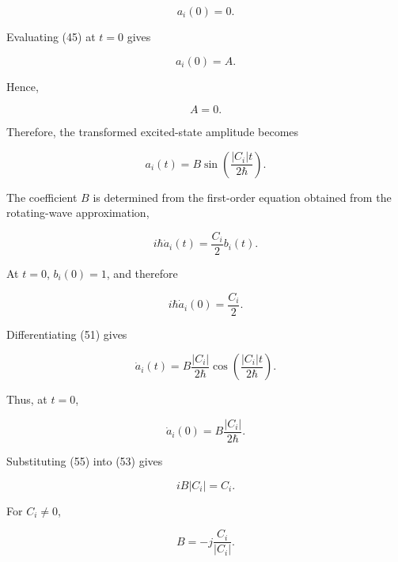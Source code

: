 \documentclass[12pt,a4paper]{article}
\begin{document}
\begin{equation}
a_i(0)=0.
\tag{48}
\end{equation}

Evaluating (45) at $t=0$ gives

\begin{equation}
a_i(0)=A.
\tag{49}
\end{equation}

Hence,

\begin{equation}
A=0.
\tag{50}
\end{equation}

Therefore, the transformed excited-state amplitude becomes

\begin{equation}
a_i(t)
=
B\sin\left(\frac{|C_i|t}{2\hbar}\right).
\tag{51}
\end{equation}

The coefficient $B$ is determined from the first-order equation obtained from the rotating-wave approximation,

\begin{equation}
i\hbar\dot a_i(t)=\frac{C_i}{2}b_i(t).
\tag{52}
\end{equation}

At $t=0$, $b_i(0)=1$, and therefore

\begin{equation}
i\hbar\dot a_i(0)=\frac{C_i}{2}.
\tag{53}
\end{equation}

Differentiating (51) gives

\begin{equation}
\dot a_i(t)
=
B\frac{|C_i|}{2\hbar}
\cos\left(\frac{|C_i|t}{2\hbar}\right).
\tag{54}
\end{equation}

Thus, at $t=0$,

\begin{equation}
\dot a_i(0)=B\frac{|C_i|}{2\hbar}.
\tag{55}
\end{equation}

Substituting (55) into (53) gives

\begin{equation}
iB|C_i|=C_i.
\tag{56}
\end{equation}

For $C_i\neq0$,

\begin{equation}
B=-j\frac{C_i}{|C_i|}.
\tag{57}
\end{equation}
\end{document}
